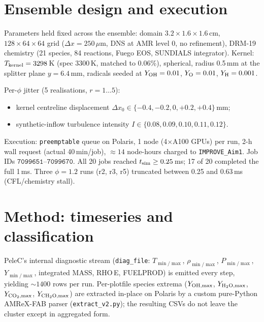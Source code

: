 \documentclass[11pt]{article}
\begin{document}
\section{Ensemble design and execution}
Parameters held fixed across the ensemble: domain
\(3.2\times1.6\times1.6\)\,cm, \(128\times64\times64\) grid
(\(\Delta x=250\,\mu\)m, DNS at AMR level 0, no refinement), DRM-19 chemistry
(21 species, 84 reactions, Fuego EOS, SUNDIALS integrator).  Kernel:
\(T_{\rm kernel}=3298\)\,K (spec 3300\,K, matched to 0.06\%), spherical, radius
0.5\,mm at the splitter plane \(y=6.4\)\,mm, radicals seeded at
\(Y_{\rm OH}=0.01\), \(Y_{\rm O}=0.01\), \(Y_{\rm H}=0.001\).

Per-\(\phi\) jitter (5 realisations, \(r=1\ldots5\)):
\begin{itemize}
\item kernel centreline displacement \(\Delta x_{0}\in\{-0.4,-0.2,0,+0.2,+0.4\}\)\,mm;
\item synthetic-inflow turbulence intensity \(I\in\{0.08,0.09,0.10,0.11,0.12\}\).
\end{itemize}

\noindent Execution: \texttt{preemptable} queue on Polaris, 1 node (4\(\times\)A100
GPUs) per run, 2-h wall request (actual 40\,min/job), \(\approx 14\) node-hours
charged to \texttt{IMPROVE\_Aim1}.  Job IDs
\(\texttt{7099651}\)--\(\texttt{7099670}\).  All 20 jobs reached
\(t_{\rm sim}\ge 0.25\)\,ms; 17 of 20 completed the full 1\,ms.  Three
\(\phi=1.2\) runs (r2, r3, r5) truncated between 0.25 and 0.63\,ms
(CFL/chemistry stall).

\section{Method: timeseries and classification}\label{sec:method}
PeleC's internal diagnostic stream
(\texttt{diag\_file}: \(T_{\min/\max}\), \(\rho_{\min/\max}\),
\(P_{\min/\max}\), \(Y_{\min/\max}\), integrated MASS, RHO\,E, FUELPROD)
is emitted every step, yielding \(\sim1400\) rows per run.  Per-plotfile
species extrema (\(Y_{\rm OH,max}\), \(Y_{\rm H_2O,max}\),
\(Y_{\rm CO_2,max}\), \(Y_{\rm CH_2O,max}\)) are extracted in-place on Polaris
by a custom pure-Python AMReX-FAB parser (\texttt{extract\_v2.py}); the
resulting CSVs do not leave the cluster except in aggregated form.
\end{document}
